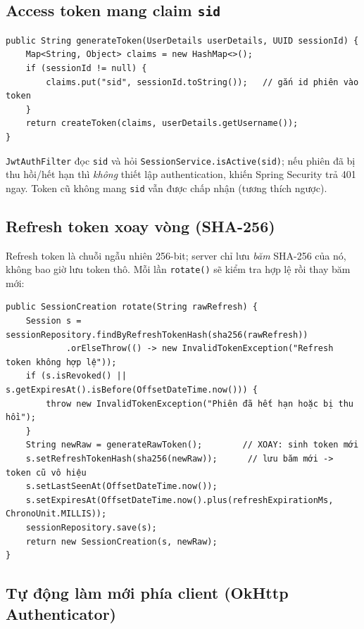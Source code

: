 \documentclass[11pt,a4paper]{article}
\begin{document}
\subsection{Access token mang claim \texttt{sid}}

\begin{lstlisting}[style=java,caption={JwtUtil -- phát access token mang claim ``sid'' (id phiên)}]
public String generateToken(UserDetails userDetails, UUID sessionId) {
    Map<String, Object> claims = new HashMap<>();
    if (sessionId != null) {
        claims.put("sid", sessionId.toString());   // gắn id phiên vào token
    }
    return createToken(claims, userDetails.getUsername());
}
\end{lstlisting}

\texttt{JwtAuthFilter} đọc \texttt{sid} và hỏi \texttt{SessionService.isActive(sid)}; nếu phiên
đã bị thu hồi/hết hạn thì \emph{không} thiết lập authentication, khiến Spring Security trả
401 ngay. Token cũ không mang \texttt{sid} vẫn được chấp nhận (tương thích ngược).

\subsection{Refresh token xoay vòng (SHA-256)}

Refresh token là chuỗi ngẫu nhiên 256-bit; server chỉ lưu \emph{băm} SHA-256 của nó, không
bao giờ lưu token thô. Mỗi lần \texttt{rotate()} sẽ kiểm tra hợp lệ rồi thay băm mới:

\begin{lstlisting}[style=java,caption={SessionService.rotate -- kiểm tra \& xoay refresh token}]
public SessionCreation rotate(String rawRefresh) {
    Session s = sessionRepository.findByRefreshTokenHash(sha256(rawRefresh))
            .orElseThrow(() -> new InvalidTokenException("Refresh token không hợp lệ"));
    if (s.isRevoked() || s.getExpiresAt().isBefore(OffsetDateTime.now())) {
        throw new InvalidTokenException("Phiên đã hết hạn hoặc bị thu hồi");
    }
    String newRaw = generateRawToken();        // XOAY: sinh token mới
    s.setRefreshTokenHash(sha256(newRaw));      // lưu băm mới -> token cũ vô hiệu
    s.setLastSeenAt(OffsetDateTime.now());
    s.setExpiresAt(OffsetDateTime.now().plus(refreshExpirationMs, ChronoUnit.MILLIS));
    sessionRepository.save(s);
    return new SessionCreation(s, newRaw);
}
\end{lstlisting}

\subsection{Tự động làm mới phía client (OkHttp Authenticator)}
\end{document}
